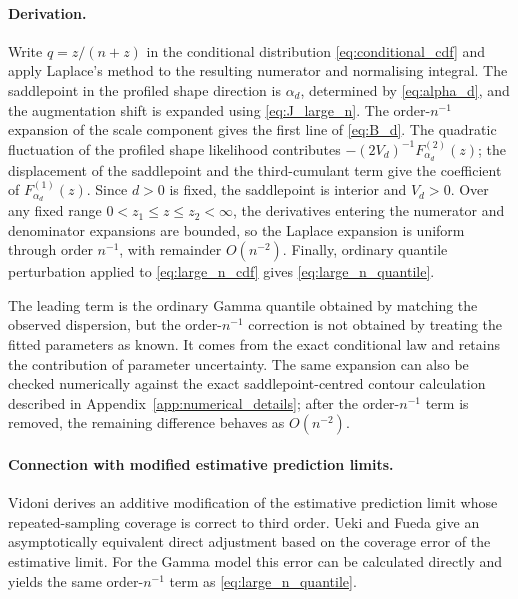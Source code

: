 \documentclass[11pt]{article}
\theoremstyle{remark}
\begin{document}
\paragraph{Derivation.}
Write $q=z/(n+z)$ in the conditional distribution \eqref{eq:conditional_cdf} and apply Laplace's method to the resulting numerator and normalising integral. The saddlepoint in the profiled shape direction is $\alpha_d$, determined by \eqref{eq:alpha_d}, and the augmentation shift is expanded using \eqref{eq:J_large_n}. The order-$n^{-1}$ expansion of the scale component gives the first line of \eqref{eq:B_d}. The quadratic fluctuation of the profiled shape likelihood contributes $-(2V_d)^{-1}F_{\alpha_d}^{(2)}(z)$; the displacement of the saddlepoint and the third-cumulant term give the coefficient of $F_{\alpha_d}^{(1)}(z)$. Since $d>0$ is fixed, the saddlepoint is interior and $V_d>0$. Over any fixed range $0<z_1\le z\le z_2<\infty$, the derivatives entering the numerator and denominator expansions are bounded, so the Laplace expansion is uniform through order $n^{-1}$, with remainder $O(n^{-2})$. Finally, ordinary quantile perturbation applied to \eqref{eq:large_n_cdf} gives \eqref{eq:large_n_quantile}.

The leading term is the ordinary Gamma quantile obtained by matching the observed dispersion, but the order-$n^{-1}$ correction is not obtained by treating the fitted parameters as known. It comes from the exact conditional law and retains the contribution of parameter uncertainty. The same expansion can also be checked numerically against the exact saddlepoint-centred contour calculation described in Appendix~\ref{app:numerical_details}; after the order-$n^{-1}$ term is removed, the remaining difference behaves as $O(n^{-2})$.

\paragraph{Connection with modified estimative prediction limits.}
Vidoni \cite{Vidoni1998} derives an additive modification of the estimative prediction limit whose repeated-sampling coverage is correct to third order. Ueki and Fueda \cite{UekiFueda2007} give an asymptotically equivalent direct adjustment based on the coverage error of the estimative limit. For the Gamma model this error can be calculated directly and yields the same order-$n^{-1}$ term as \eqref{eq:large_n_quantile}.
\end{document}
